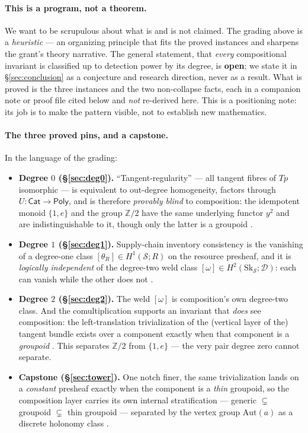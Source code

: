 \documentclass[11pt]{article}
\theoremstyle{definition}
\newcommand{\Poly}{\mathsf{Poly}}
\newcommand{\Cat}{\mathsf{Cat}}
\newcommand{\Aut}{\mathrm{Aut}}
\newcommand{\Sk}{\mathrm{Sk}}
\newcommand{\Z}{\mathbb{Z}}
\newcommand{\sS}{\mathcal{S}}
\newcommand{\cD}{\mathcal{D}}
\begin{document}
\paragraph{This is a program, not a theorem.}
We want to be scrupulous about what is and is not claimed. The grading above is a
\emph{heuristic} --- an organizing principle that fits the proved instances and sharpens the
grant's theory narrative. The general statement, that \emph{every} compositional invariant is
classified up to detection power by its degree, is \textbf{open}; we state it in
\S\ref{sec:conclusion} as a conjecture and research direction, never as a result. What is proved is
the three instances and the two non-collapse facts, each in a companion note or proof file cited
below and \emph{not} re-derived here. This is a positioning note: its job is to make the pattern
visible, not to establish new mathematics.

\paragraph{The three proved pins, and a capstone.}
In the language of the grading:

\begin{itemize}
\item \textbf{Degree $0$ (\S\ref{sec:deg0}).} ``Tangent-regularity'' --- all tangent fibres of
$Tp$ isomorphic --- is equivalent to out-degree homogeneity, factors through $U\colon\Cat\to\Poly$,
and is therefore \emph{provably blind} to composition: the idempotent monoid $\{1,e\}$ and the
group $\Z/2$ have the same underlying functor $y^2$ and are indistinguishable to it, though only
the latter is a groupoid \cite{MacBethParallel}.
\item \textbf{Degree $1$ (\S\ref{sec:deg1}).} Supply-chain inventory consistency is the vanishing
of a degree-one class $[\theta_R]\in H^1(\sS;R)$ on the resource presheaf, and it is
\emph{logically independent} of the degree-two weld class $[\omega]\in H^2(\Sk_\sS;\cD)$: each can
vanish while the other does not \cite{MacBethSupplyChain}.
\item \textbf{Degree $2$ (\S\ref{sec:deg2}).} The weld $[\omega]$ is composition's own degree-two
class. And the comultiplication supports an invariant that \emph{does} see composition: the
left-translation trivialization of the (vertical layer of the) tangent bundle exists over a
component exactly when that component is a \emph{groupoid} \cite{MacBethDelta}. This separates
$\Z/2$ from $\{1,e\}$ --- the very pair degree zero cannot separate.
\item \textbf{Capstone (\S\ref{sec:tower}).} One notch finer, the same trivialization lands on a
\emph{constant} presheaf exactly when the component is a \emph{thin} groupoid, so the composition
layer carries its own internal stratification --- generic $\subsetneq$ groupoid $\subsetneq$ thin
groupoid --- separated by the vertex group $\Aut(a)$ as a discrete holonomy class
\cite{MacBethThin}.
\end{itemize}
\end{document}
